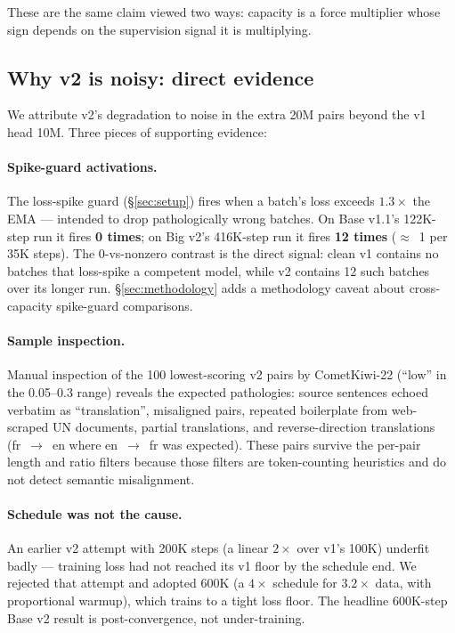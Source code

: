 These are the same claim viewed two ways: capacity is a force multiplier whose sign depends on the supervision signal it is multiplying.

\subsection{Why v2 is noisy: direct evidence}
We attribute v2's degradation to noise in the extra 20M pairs beyond the v1 head 10M. Three pieces of supporting evidence:

\paragraph{Spike-guard activations.} The loss-spike guard (\S\ref{sec:setup}) fires when a batch's loss exceeds $1.3\times$ the EMA --- intended to drop pathologically wrong batches. On Base v1.1's 122K-step run it fires \textbf{0 times}; on Big v2's 416K-step run it fires \textbf{12 times} ($\approx$~1 per 35K steps). The 0-vs-nonzero contrast is the direct signal: clean v1 contains no batches that loss-spike a competent model, while v2 contains 12 such batches over its longer run. \S\ref{sec:methodology} adds a methodology caveat about cross-capacity spike-guard comparisons.

\paragraph{Sample inspection.} Manual inspection of the 100 lowest-scoring v2 pairs by CometKiwi-22 (``low'' in the 0.05--0.3 range) reveals the expected pathologies: source sentences echoed verbatim as ``translation'', misaligned pairs, repeated boilerplate from web-scraped UN documents, partial translations, and reverse-direction translations (fr~$\rightarrow$~en where en~$\rightarrow$~fr was expected). These pairs survive the per-pair length and ratio filters because those filters are token-counting heuristics and do not detect semantic misalignment.

\paragraph{Schedule was not the cause.} An earlier v2 attempt with 200K steps (a linear $2\times$ over v1's 100K) underfit badly --- training loss had not reached its v1 floor by the schedule end. We rejected that attempt and adopted 600K (a $4\times$ schedule for $3.2\times$ data, with proportional warmup), which trains to a tight loss floor. The headline 600K-step Base v2 result is post-convergence, not under-training.


